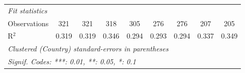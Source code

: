 \begin{tabular}{lcccccccc}
   \midrule \emph{Fit statistics}\\
   Observations                                               & 321            & 321            & 318            & 305            & 276           & 276           & 207           & 205\\  
   R$^2$                                                      & 0.319          & 0.319          & 0.346          & 0.294          & 0.293         & 0.294         & 0.337         & 0.349\\  
   \midrule
   \multicolumn{9}{l}{\emph{Clustered (Country) standard-errors in parentheses}}\\
   \multicolumn{9}{l}{\emph{Signif. Codes: ***: 0.01, **: 0.05, *: 0.1}}\\
\end{tabular}
\par\endgroup


